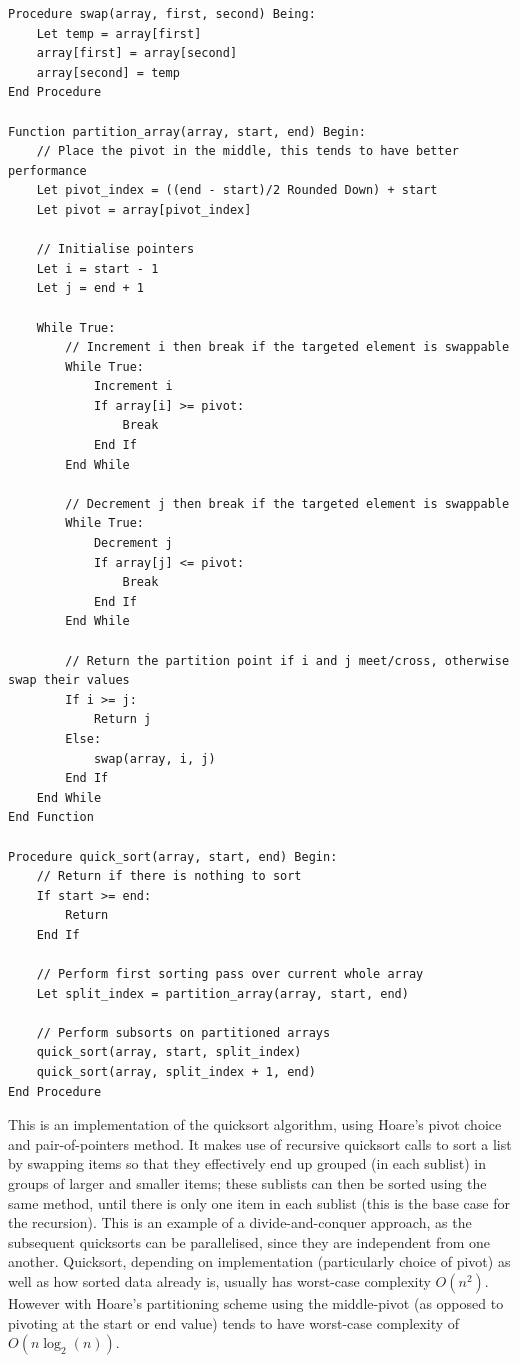 \documentclass[
]{article}
\begin{document}
\begin{verbatim}
Procedure swap(array, first, second) Being:
    Let temp = array[first]
    array[first] = array[second]
    array[second] = temp
End Procedure

Function partition_array(array, start, end) Begin:
    // Place the pivot in the middle, this tends to have better performance
    Let pivot_index = ((end - start)/2 Rounded Down) + start
    Let pivot = array[pivot_index]
    
    // Initialise pointers
    Let i = start - 1
    Let j = end + 1
    
    While True:
        // Increment i then break if the targeted element is swappable
        While True:
            Increment i
            If array[i] >= pivot:
                Break
            End If
        End While
        
        // Decrement j then break if the targeted element is swappable
        While True:
            Decrement j
            If array[j] <= pivot:
                Break
            End If
        End While
        
        // Return the partition point if i and j meet/cross, otherwise swap their values
        If i >= j:
            Return j
        Else:
            swap(array, i, j)
        End If
    End While
End Function

Procedure quick_sort(array, start, end) Begin:
    // Return if there is nothing to sort
    If start >= end:
        Return
    End If
    
    // Perform first sorting pass over current whole array
    Let split_index = partition_array(array, start, end)
    
    // Perform subsorts on partitioned arrays
    quick_sort(array, start, split_index)
    quick_sort(array, split_index + 1, end)
End Procedure
\end{verbatim}

This is an implementation of the quicksort algorithm, using Hoare's
pivot choice and pair-of-pointers method. It makes use of recursive
quicksort calls to sort a list by swapping items so that they
effectively end up grouped (in each sublist) in groups of larger and
smaller items; these sublists can then be sorted using the same method,
until there is only one item in each sublist (this is the base case for
the recursion). This is an example of a divide-and-conquer approach, as
the subsequent quicksorts can be parallelised, since they are
independent from one another. Quicksort, depending on implementation
(particularly choice of pivot) as well as how sorted data already is,
usually has worst-case complexity \(O(n^2)\). However with Hoare's
partitioning scheme using the middle-pivot (as opposed to pivoting at
the start or end value) tends to have worst-case complexity of
\(O(n \log_2(n))\).
\end{document}
